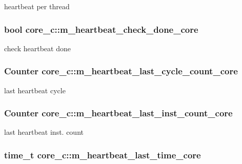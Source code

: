\label{classcore__c_a2df8391575050b987e43bd1d4e3a3308}
heartbeat per thread \hypertarget{classcore__c_ab05dd1f0dc2730e1efc46c7ee2288aee}{
\subsubsection[{m\_\-heartbeat\_\-check\_\-done\_\-core}]{\setlength{\rightskip}{0pt plus 5cm}bool {\bf core\_\-c::m\_\-heartbeat\_\-check\_\-done\_\-core}}}
\label{classcore__c_ab05dd1f0dc2730e1efc46c7ee2288aee}
check heartbeat done \hypertarget{classcore__c_a3f04f1619a29cfc03525aa63f958a3c7}{
\subsubsection[{m\_\-heartbeat\_\-last\_\-cycle\_\-count\_\-core}]{\setlength{\rightskip}{0pt plus 5cm}Counter {\bf core\_\-c::m\_\-heartbeat\_\-last\_\-cycle\_\-count\_\-core}}}
\label{classcore__c_a3f04f1619a29cfc03525aa63f958a3c7}
last heartbeat cycle \hypertarget{classcore__c_a9b56be75f1ec5fa4113f2412d73d5717}{
\subsubsection[{m\_\-heartbeat\_\-last\_\-inst\_\-count\_\-core}]{\setlength{\rightskip}{0pt plus 5cm}Counter {\bf core\_\-c::m\_\-heartbeat\_\-last\_\-inst\_\-count\_\-core}}}
\label{classcore__c_a9b56be75f1ec5fa4113f2412d73d5717}
last heartbeat inst. count \hypertarget{classcore__c_ac39e45112af1b8690321132caf0c6aec}{
\subsubsection[{m\_\-heartbeat\_\-last\_\-time\_\-core}]{\setlength{\rightskip}{0pt plus 5cm}time\_\-t {\bf core\_\-c::m\_\-heartbeat\_\-last\_\-time\_\-core}}}
